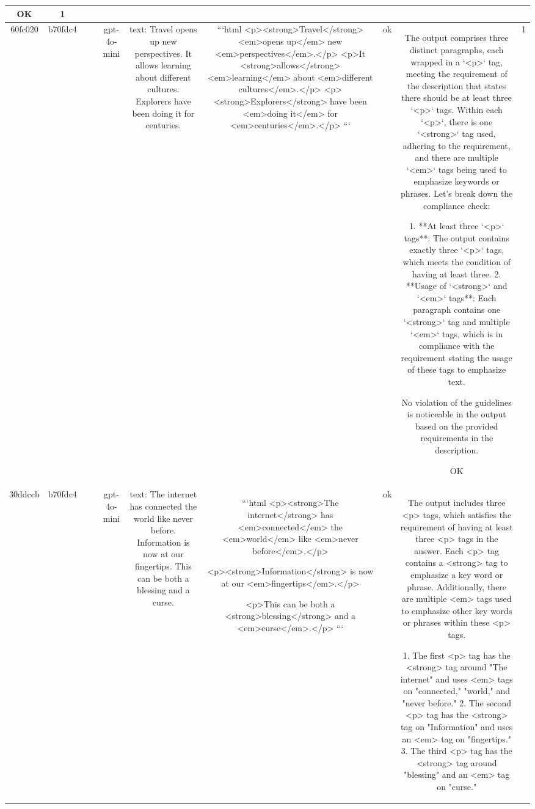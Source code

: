\begin{table}[h!]
\begin{tabular}{|c|c|c|c|c|c|c|c|c|c|}
OK & 1\\
\hline
60fc020 & b70fdc4 &  &  & gpt-4o-mini & text: Travel opens up new perspectives. It allows learning about different cultures. Explorers have been doing it for centuries. & ```html
<p><strong>Travel</strong> <em>opens up</em> new <em>perspectives</em>.</p>
<p>It <strong>allows</strong> <em>learning</em> about <em>different cultures</em>.</p>
<p><strong>Explorers</strong> have been <em>doing it</em> for <em>centuries</em>.</p>
``` & ok & The output comprises three distinct paragraphs, each wrapped in a `<p>` tag, meeting the requirement of the description that states there should be at least three `<p>` tags. Within each `<p>`, there is one `<strong>` tag used, adhering to the requirement, and there are multiple `<em>` tags being used to emphasize keywords or phrases. Let's break down the compliance check:

1. **At least three `<p>` tags**: The output contains exactly three `<p>` tags, which meets the condition of having at least three.
2. **Usage of `<strong>` and `<em>` tags**: Each paragraph contains one `<strong>` tag and multiple `<em>` tags, which is in compliance with the requirement stating the usage of these tags to emphasize text.

No violation of the guidelines is noticeable in the output based on the provided requirements in the description.

OK & 1\\
\hline
30ddccb & b70fdc4 &  &  & gpt-4o-mini & text: The internet has connected the world like never before. Information is now at our fingertips. This can be both a blessing and a curse. & ```html
<p><strong>The internet</strong> has <em>connected</em> the <em>world</em> like <em>never before</em>.</p>

<p><strong>Information</strong> is now at our <em>fingertips</em>.</p>

<p>This can be both a <strong>blessing</strong> and a <em>curse</em>.</p>
``` & ok & The output includes three <p> tags, which satisfies the requirement of having at least three <p> tags in the answer. Each <p> tag contains a <strong> tag to emphasize a key word or phrase. Additionally, there are multiple <em> tags used to emphasize other key words or phrases within these <p> tags.

1. The first <p> tag has the <strong> tag around "The internet" and uses <em> tags on "connected," "world," and "never before." 
2. The second <p> tag has the <strong> tag on "Information" and uses an <em> tag on "fingertips."
3. The third <p> tag has the <strong> tag around "blessing" and an <em> tag on "curse."


\end{tabular}
\end{table}
